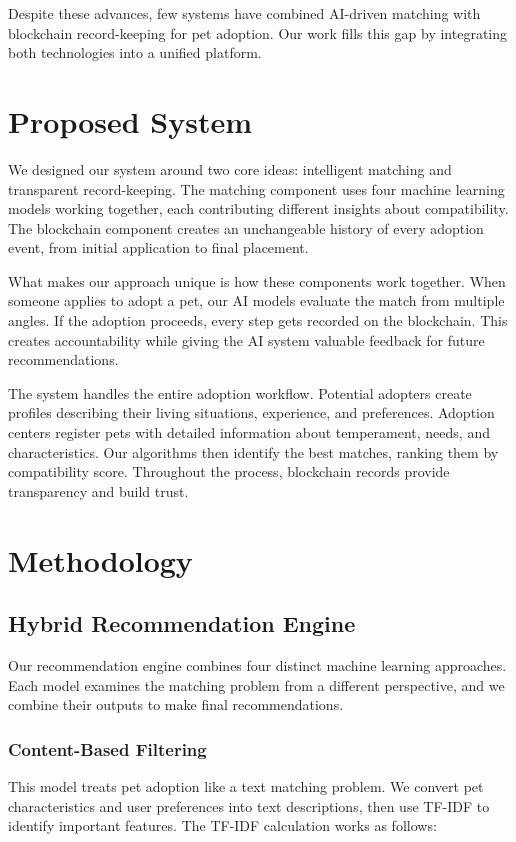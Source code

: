 \documentclass[conference]{IEEEtran}
\begin{document}
Despite these advances, few systems have combined AI-driven matching with blockchain record-keeping for pet adoption. Our work fills this gap by integrating both technologies into a unified platform.

\section{Proposed System}

We designed our system around two core ideas: intelligent matching and transparent record-keeping. The matching component uses four machine learning models working together, each contributing different insights about compatibility. The blockchain component creates an unchangeable history of every adoption event, from initial application to final placement.

What makes our approach unique is how these components work together. When someone applies to adopt a pet, our AI models evaluate the match from multiple angles. If the adoption proceeds, every step gets recorded on the blockchain. This creates accountability while giving the AI system valuable feedback for future recommendations.

The system handles the entire adoption workflow. Potential adopters create profiles describing their living situations, experience, and preferences. Adoption centers register pets with detailed information about temperament, needs, and characteristics. Our algorithms then identify the best matches, ranking them by compatibility score. Throughout the process, blockchain records provide transparency and build trust.

\section{Methodology}

\subsection{Hybrid Recommendation Engine}

Our recommendation engine combines four distinct machine learning approaches. Each model examines the matching problem from a different perspective, and we combine their outputs to make final recommendations.

\subsubsection{Content-Based Filtering}
This model treats pet adoption like a text matching problem. We convert pet characteristics and user preferences into text descriptions, then use TF-IDF to identify important features. The TF-IDF calculation works as follows:
\end{document}
